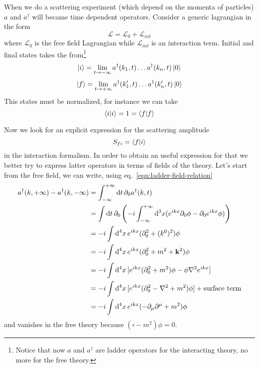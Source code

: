 \documentclass[../main/main.tex]{subfiles}
\begin{document}
When we do a scattering experiment (which depend on the momenta of particles) $a$ and $a^\dagger$ will became time dependent operators. Consider a generic lagrangian in the form
\[\mathcal L=\mathcal L_0+\mathcal L_{int}\]
where $\mathcal L_0$ is the free field Lagrangian while $\mathcal L_{int}$ is an interaction term.
Initial and final states takes the from\footnote{Notice that now $a$ and $a^\dagger$ are ladder operators for the interacting theory, no more for the free theory.}
\[\ket i=\lim_{t\rightarrow -\infty}a^\dagger(k_1,t)\dots a^\dagger(k_n,t)\ket0\]
\[\ket f=\lim_{t\rightarrow +\infty}a^\dagger(k_1',t)\dots a^\dagger(k'_n,t)\ket0\]
This states must be normalized, for instance we can take
\[\braket i=1=\braket f\]

Now we look for an explicit expression for the scattering amplitude
\[S_{fi}=\braket {f}{i}\]
in the interaction formalism.
In order to obtain an useful expression for that we better try to express latter operators in terms of fields of the theory.
Let's start from the free field, we can write, using eq.~\eqref{eqn:ladder-field-relation}
\begin{equation}\label{eqn:ladder-inf-diff}\begin{split}
a^\dagger(k,+\infty)-a^\dagger(k, -\infty)
&=\int_{-\infty}^{+\infty}\de t\,\partial_0a^\dagger(k,t)\\
&=\int\de t\,\partial_0\left(-i\int_{-\infty}^{+\infty}\de^3x(e^{ikx}\partial_0\phi-\partial_0e^{ikx}\phi)\right)\\
&=-i\int\de^4x\,e^{ikx}(\partial_0^2+(k^0)^2)\phi\\
&=-i\int\de^4x\,e^{ikx}(\partial_0^2+m^2+\vec k^2)\phi\\
&=-i\int\de^4x\,[e^{ikx}(\partial_0^2+m^2)\phi-\phi\vect{\nabla}^2e^{ikx}]\\
&=-i\int\de^4x\,[e^{ikx}(\partial_0^2-\vect{\nabla}^2+m^2)\phi] + \text{surface term}\\
&=-i\int\de^4x\,e^{ikx}(-\partial_\mu\partial^\mu+m^2)\phi
\end{split}\end{equation}
and vanishes in the free theory because $(\square- m^2)\phi=0$.
\end{document}
